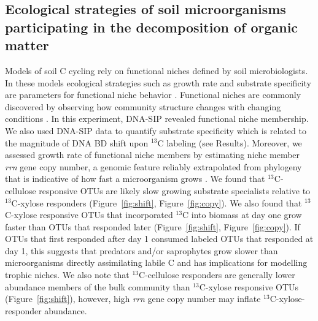 \subsection{Ecological strategies of soil microorganisms participating in the
decomposition of organic matter}
Models of soil C cycling rely on functional niches defined by soil
microbiologists. In these models ecological strategies such as growth rate and
substrate specificity are parameters for functional niche behavior
\citep{Kaiser2014a}. Functional niches are commonly discovered by observing how
community structure changes with changing conditions
\citep{Fierer2007}. In this experiment, DNA-SIP revealed functional niche
membership. We also used DNA-SIP data to quantify substrate specificity which
is related to the magnitude of DNA BD shift upon $^{13}$C labeling (see
Results). Moreover, we assessed growth rate of functional niche members by
estimating niche member \textit{rrn} gene copy number, a genomic feature
reliably extrapolated from phylogeny that is indicative of how fast
a microorganism grows \citep{11125085,Kembel_2012}. We found that
$^{13}$C-cellulose responsive OTUs are likely slow growing substrate
specialists relative to $^{13}$C-xylose responders (Figure~\ref{fig:shift},
Figure~\ref{fig:copy}). We also found that $^{13}$C-xylose responsive OTUs that
incorporated $^{13}$C into biomass at day one grow faster than OTUs that
responded later (Figure~\ref{fig:shift}, Figure~\ref{fig:copy}). If OTUs that
first responded after day 1 consumed labeled OTUs that responded at day 1, this
suggests that predators and/or saprophytes grow slower than microorganisms
directly assimilating labile C and has implications for modelling trophic
niches. We also note that $^{13}$C-cellulose responders are generally lower
abundance members of the bulk community than $^{13}$C-xylose responsive OTUs
(Figure~\ref{fig:shift}), however, high \textit{rrn} gene copy number may
inflate $^{13}$C-xylose-responder abundance.

